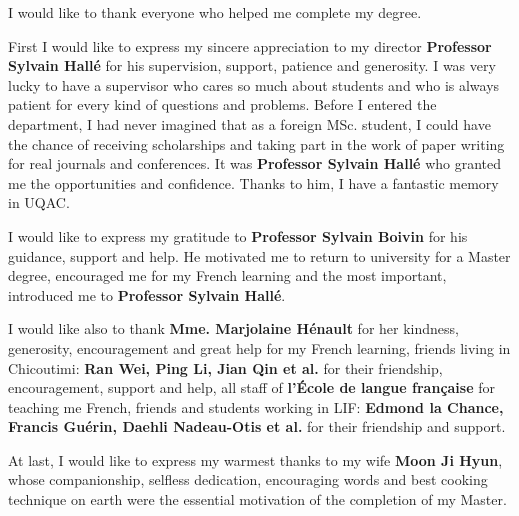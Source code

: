 
\begin{acknowledgements}

I would like to thank everyone who helped me complete my degree.

First I would like to express my sincere appreciation to my director \textbf{Professor Sylvain Hallé} for his supervision, support, patience and generosity. I was very lucky to have a supervisor who cares so much about students and who is always patient for every kind of questions and problems. Before I entered the department, I had never imagined that as a foreign MSc. student, I could have the chance of receiving scholarships and taking part in the work of paper writing for real journals and conferences. It was \textbf{Professor Sylvain Hallé} who granted me the opportunities and confidence. Thanks to him, I have a fantastic memory in UQAC.

I would like to express my gratitude to \textbf{Professor Sylvain Boivin} for his guidance, support and help. He motivated me to return to university for a Master degree, encouraged me for my French learning and the most important, introduced me to \textbf{Professor Sylvain Hallé}.

I would like also to thank \textbf{Mme. Marjolaine Hénault} for her kindness, generosity, encouragement and great help for my French learning, friends living in Chicoutimi: \textbf{Ran Wei, Ping Li, Jian Qin et al.} for their friendship, encouragement, support and help, all staff of \textbf{l'École de langue française} for teaching me French, friends and students working in LIF: \textbf{Edmond la Chance, Francis Guérin, Daehli Nadeau-Otis et al.} for their friendship and support.

At last, I would like to express my warmest thanks to my wife \textbf{Moon Ji Hyun}, whose companionship, selfless dedication, encouraging words and best cooking technique on earth were the essential motivation of the completion of my Master.

\end{acknowledgements}